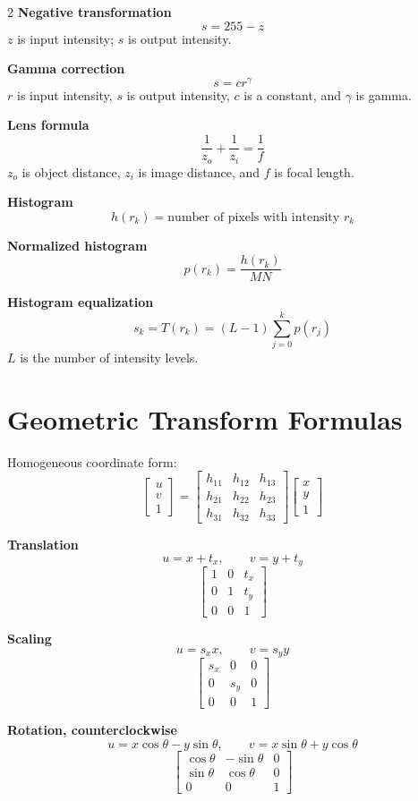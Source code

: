 \documentclass[8pt]{extarticle}
\begin{document}
\begin{multicols}{2}
\textbf{Negative transformation}
\[
s=255-z
\]
$z$ is input intensity; $s$ is output intensity.

\textbf{Gamma correction}
\[
s=cr^\gamma
\]
$r$ is input intensity, $s$ is output intensity, $c$ is a constant, and $\gamma$ is gamma.

\textbf{Lens formula}
\[
\frac{1}{z_o}+\frac{1}{z_i}=\frac{1}{f}
\]
$z_o$ is object distance, $z_i$ is image distance, and $f$ is focal length.

\textbf{Histogram}
\[
h(r_k)=\text{number of pixels with intensity } r_k
\]

\textbf{Normalized histogram}
\[
p(r_k)=\frac{h(r_k)}{MN}
\]

\textbf{Histogram equalization}
\[
s_k=T(r_k)=(L-1)\sum_{j=0}^{k}p(r_j)
\]
$L$ is the number of intensity levels.

\section{Geometric Transform Formulas}

Homogeneous coordinate form:
\[
\begin{bmatrix}u\\v\\1\end{bmatrix}
=
\begin{bmatrix}
h_{11}&h_{12}&h_{13}\\
h_{21}&h_{22}&h_{23}\\
h_{31}&h_{32}&h_{33}
\end{bmatrix}
\begin{bmatrix}x\\y\\1\end{bmatrix}
\]

\textbf{Translation}
\[
u=x+t_x,\qquad v=y+t_y
\]
\[
\begin{bmatrix}1&0&t_x\\0&1&t_y\\0&0&1\end{bmatrix}
\]

\textbf{Scaling}
\[
u=s_xx,\qquad v=s_yy
\]
\[
\begin{bmatrix}s_x&0&0\\0&s_y&0\\0&0&1\end{bmatrix}
\]

\textbf{Rotation, counterclockwise}
\[
u=x\cos\theta-y\sin\theta,\qquad v=x\sin\theta+y\cos\theta
\]
\[
\begin{bmatrix}\cos\theta&-\sin\theta&0\\\sin\theta&\cos\theta&0\\0&0&1\end{bmatrix}
\]


\end{multicols}
\end{document}
